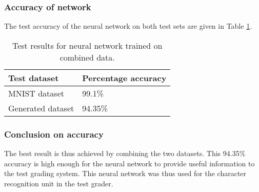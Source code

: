 \subsubsection{Accuracy of network}
The test accuracy of the neural network on both test sets are given in Table \ref{tbl:nnResult3}.

\begin{table}
\caption{Test results for neural network trained on combined data.} \label{tbl:nnResult3}
  \centering
\begin{tabular}{|p{4cm}|p{5cm}|}
\hline
\textbf{Test dataset}&\textbf{Percentage accuracy}\\
\hline
MNIST dataset&99.1\%\\
\hline
Generated dataset&94.35\%\\
\hline
\end{tabular}
\end{table}

\subsubsection{Conclusion on accuracy}
The best result is thus achieved by combining the two datasets. This 94.35\% accuracy is high enough for the neural network to provide useful information to the test grading system. This neural network was thus used for the character recognition unit in the test grader.